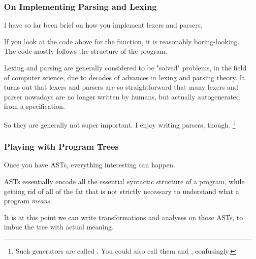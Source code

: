 \documentclass[aspectratio=169, handout]{beamer}
\begin{document}
\begin{frame}[fragile]
  \frametitle{On Implementing Parsing and Lexing}

  I have so far been brief on how you implement lexers and parsers.

  \pause
  \vspace{\fill}

  If you look at the code above for the  function, it is
  reasonably boring-looking. The code mostly follows the structure of
  the program.

  \pause
  \vspace{\fill}

  Lexing and parsing are generally considered to be "solved" problems, in the
  field of computer science, due to decades of advances in lexing and parsing
  theory. It turns out that lexers and parsers are so straightforward that many
  lexers and parser nowadays are no longer written by humans, but actually
  autogenerated from a specification.

  \pause
  \vspace{\fill}

  So they are generally not super important. I enjoy writing parsers, though.
  \footnote{Such generators are called .
  You could also call them  and ,
  confusingly.}
\end{frame}

\begin{frame}[fragile]
  \frametitle{Playing with Program Trees}

  Once you have ASTs, everything interesting can happen.

  \pause
  \vspace{\fill}

  ASTs essentially encode all the essential syntactic structure of a program,
  while getting rid of all of the fat that is not strictly necessary to understand
  what a program \textit{means}.

  \pause
  \vspace{\fill}

  It is at this point we can write transformations and analyses on those ASTs,
  to imbue the tree with actual meaning.

  \pause
  \vspace{\fill}

\end{frame}
\end{document}

